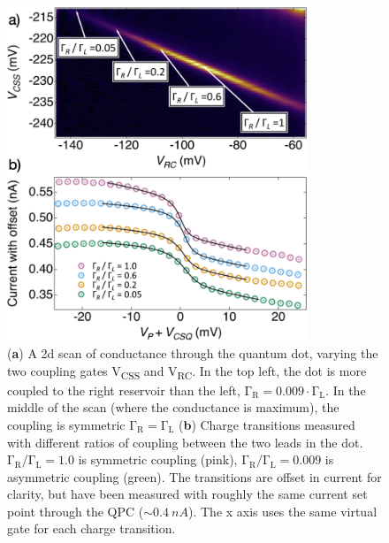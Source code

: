 \begin{figure}[!bht]
 \begin{center}
 \includegraphics[width=0.8\textwidth]{figures/ch3/crop_FiguresMaster.018.png}
 \caption[Varying coupling symmetry]{\label{fig:ch3/symmetry_picking} 
 (\textbf{a}) A 2d scan of conductance through the quantum dot, varying the two coupling gates V\textsubscript{CSS} and V\textsubscript{RC}. In the top left, the dot is more coupled to the right reservoir than the left, $\mathrm{\Gamma_R} = 0.009\cdot\mathrm{\Gamma_L}$. In the middle of the scan (where the conductance is maximum), the coupling is symmetric $\mathrm{\Gamma_R} = \mathrm{\Gamma_L}$ (\textbf{b}) Charge transitions measured with different ratios of coupling between the two leads in the dot. $\mathrm{\Gamma_R/\Gamma_L} = 1.0$ is symmetric coupling (pink), $\mathrm{\Gamma_R/\Gamma_L} = 0.009$ is asymmetric coupling (green). The transitions are offset in current for clarity, but have been measured with roughly the same current set point through the QPC ($\sim\qty{0.4}{nA}$). The x axis uses the same virtual gate for each charge transition. 
 }
 \end{center}
\end{figure}


